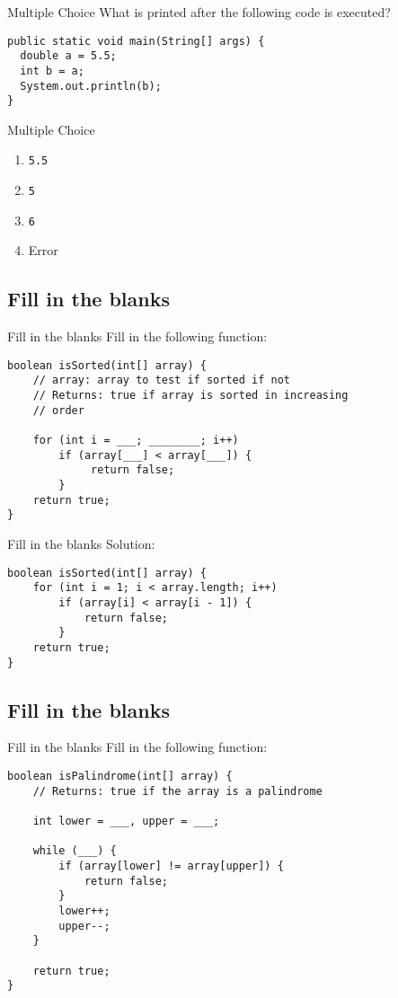 \documentclass[9pt]{beamer}
\begin{document}
\begin{frame}[fragile]{Multiple Choice}
  What is printed after the following code is executed?

  \begin{lstlisting}
public static void main(String[] args) {
  double a = 5.5;
  int b = a;
  System.out.println(b);
}
  \end{lstlisting}
\end{frame}
\begin{frame}[fragile]{Multiple Choice}
  \begin{enumerate}
    \item
      {\tt 5.5}
    \item
      {\tt 5}
    \item
      {\tt 6}
    \item
      \alert<2>{Error}
  \end{enumerate}
\end{frame}


\subsection{Fill in the blanks}
\begin{frame}[fragile]{Fill in the blanks}
  Fill in the following function:
  \begin{lstlisting}
boolean isSorted(int[] array) {
    // array: array to test if sorted if not
    // Returns: true if array is sorted in increasing
    // order

    for (int i = ___; ________; i++)
        if (array[___] < array[___]) {
             return false;
        }
    return true;
}
  \end{lstlisting}
\end{frame}

\begin{frame}[fragile]{Fill in the blanks}
  Solution:
  \begin{lstlisting}
boolean isSorted(int[] array) {
    for (int i = 1; i < array.length; i++)
        if (array[i] < array[i - 1]) {
            return false;
        }
    return true;
}
  \end{lstlisting}
\end{frame}

\subsection{Fill in the blanks}
\begin{frame}[fragile]{Fill in the blanks}
  Fill in the following function:
  \begin{lstlisting}
boolean isPalindrome(int[] array) {
    // Returns: true if the array is a palindrome

    int lower = ___, upper = ___;

    while (___) {
        if (array[lower] != array[upper]) {
            return false;
        }
        lower++;
        upper--;
    }

    return true;
}
  \end{lstlisting}
\end{frame}
\end{document}
